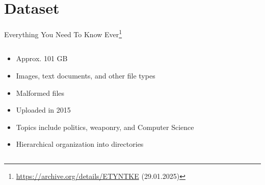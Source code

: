 \section{Dataset}

\begin{frame}{Everything You Need To Know Ever\footnote{\url{https://archive.org/details/ETYNTKE} (29.01.2025)}}
    \begin{columns}[T] %
        \begin{column}{0.6\textwidth}
             \begin{itemize}
                \item Approx. 101 GB 
                \item Images, text documents, and other file types
                \item Malformed files
                \item Uploaded in 2015
                \item Topics include politics, weaponry, and Computer Science
                \item Hierarchical organization into directories
            \end{itemize}
        \end{column}


\end{columns}
\end{frame}
